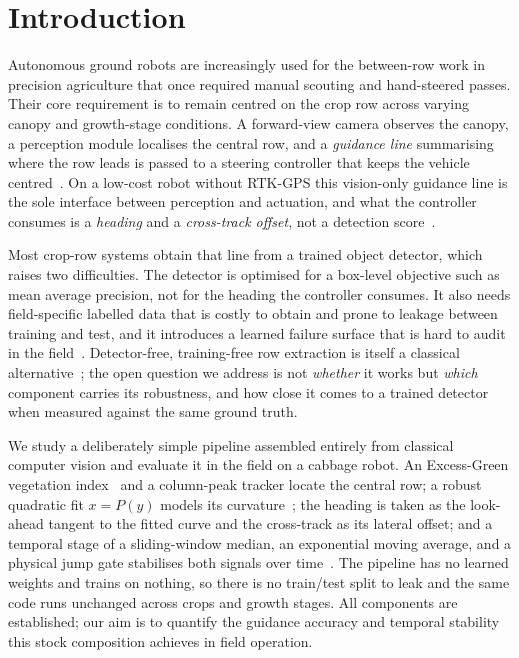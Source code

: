 
\section{Introduction}
\label{sec:introduction}

\noindent Autonomous ground robots are increasingly used for the between-row work in precision agriculture
that once required manual scouting and hand-steered passes. Their core requirement is to remain centred on
the crop row across varying canopy and growth-stage conditions. A forward-view camera observes the canopy, a perception module localises the
central row, and a \emph{guidance line} summarising where the row leads is passed to a steering controller
that keeps the vehicle centred~\cite{cth1,cth2,cth6}. On a low-cost robot without RTK-GPS this vision-only
guidance line is the sole interface between perception and actuation, and what the controller consumes is
a \emph{heading} and a \emph{cross-track offset}, not a detection score~\cite{cth3,sogaard}.

\noindent Most crop-row systems obtain that line from a trained object detector, which raises two
difficulties. The detector is optimised for a box-level objective such as mean average precision, not for the
heading the controller consumes. It also
needs field-specific labelled data that is costly to obtain and prone to leakage between training and
test, and it introduces a learned failure surface that is hard to audit in the field~\cite{cth1,sogaard}.
Detector-free, training-free row extraction is itself a classical alternative~\cite{marchant1995,astrand2005,bakker2008};
the open question we address is not \emph{whether} it works but \emph{which} component carries its
robustness, and how close it comes to a trained detector when measured against the same ground truth.

\noindent We study a deliberately simple pipeline assembled entirely from classical computer vision and
evaluate it in the field on a cabbage robot. An Excess-Green vegetation index~\cite{woebbecke1995,meyer2008}
and a column-peak tracker locate the central row; a robust quadratic fit $x=P(y)$ models its
curvature~\cite{huber1964,marchant1995}; the heading is taken as the look-ahead tangent to the fitted curve
and the cross-track as its lateral offset; and a temporal stage of a sliding-window median, an exponential
moving average, and a physical jump gate stabilises both signals over time~\cite{kalman1960}. The pipeline
has no learned weights and trains on nothing, so there is no train/test split to leak and the same code
runs unchanged across crops and growth stages. All components are established; our aim is to quantify the
guidance accuracy and temporal stability this stock composition achieves in field operation.

